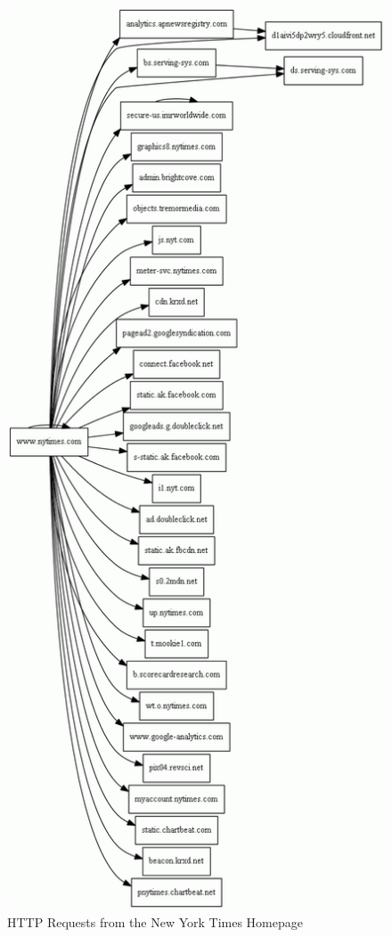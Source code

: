 \begin{figure}
\centerline{
  \includegraphics{chapter2.tex/Image1}
  }
\caption{HTTP Requests from the New York Times Homepage}
\label{http}
\end{figure}


